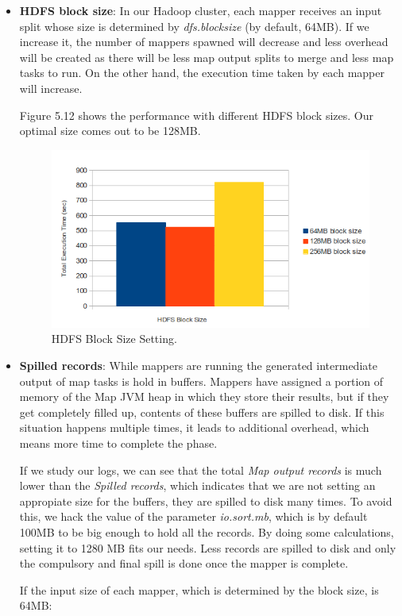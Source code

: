\begin{itemize}
\item \textbf{HDFS block size}: In our Hadoop cluster, each mapper receives an input split whose size is determined by \textit{dfs.blocksize} (by default, 64MB). If we increase it, the number of mappers spawned will decrease and less overhead will be created as there will be less map output splits to merge and less map tasks to run. On the other hand, the execution time taken by each mapper will increase. 
\par
Figure 5.12 shows the performance with different HDFS block sizes. Our optimal size comes out to be 128MB.

\begin{figure}[htb]
\centering
\includegraphics[width=1\textwidth]{./images/HDFSBlockSize.png}
\caption{HDFS Block Size Setting.} \label{fig:HDFSBlockSize}
\end{figure}




\item \textbf{Spilled records}: While mappers are running the generated intermediate output of map tasks is hold in buffers. Mappers have assigned a portion of memory of the Map JVM heap in which they store their results, but if they get completely filled up, contents of these buffers are spilled to disk. If this situation happens multiple times, it leads to additional overhead, which means more time to complete the phase. 
\par
If we study our logs, we can see that the total \textit{Map output records} is much lower than the \textit{Spilled records}, which indicates that we are not setting an appropiate size for the buffers, they are spilled to disk many times. To avoid this, we hack the value of the parameter \textit{io.sort.mb}, which is by default 100MB to be big enough to hold all the records. By doing some calculations, setting it to 1280 MB fits our needs. Less records are spilled to disk and only the compulsory and final spill is done once the mapper is complete.
\par
If the input size of each mapper, which is determined by the block size, is 64MB:
\bigskip


\end{itemize}
